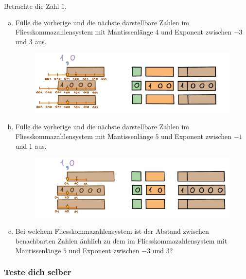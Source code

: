 \begin{aufgabe}\label{nachbarn-laenge}
Betrachte die Zahl \(1\).

\begin{enumerate}[(a)]
\item Fülle die vorherige und die nächste darstellbare Zahlen im Fliesskommazahlensystem mit Mantissenlänge \(4\) und Exponent zwischen \(-3\) und \(3\) aus.
\begin{figure}[H]
\centering
\includegraphics[width=\linewidth]{Pictures/Nachbarn1-4-3.png}
\end{figure}

\item Fülle die vorherige und die nächste darstellbare Zahlen im Fliesskommazahlensystem mit Mantissenlänge \(5\) und Exponent zwischen \(-1\) und \(1\) aus.
\begin{figure}[H]
\centering
\includegraphics[width=\linewidth]{Pictures/Nachbarn1-5-2.png}
\end{figure}

\item Bei welchem Fliesskommazahlensystem ist der Abstand zwischen benachbarten Zahlen änhlich zu dem im Fliesskommazahlensystem mit Mantissenlänge \(5\) und Exponent zwischen \(-3\) und \(3\)?
\end{enumerate}

\end{aufgabe}

\subsubsection*{\textcolor{blue-violet}{Teste dich selber}}


